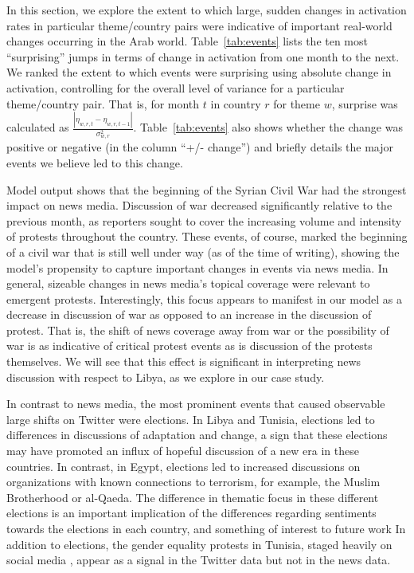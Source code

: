 In this section, we explore the extent to which large, sudden changes in activation rates in particular theme/country pairs were indicative of important real-world changes occurring in the Arab world.  Table~\ref{tab:events} lists the ten most ``surprising'' jumps in terms of change in activation from one month to the next.  We ranked the extent to which events were surprising using absolute change in activation, controlling for the overall level of variance for a particular theme/country pair.  That is, for month $t$ in country $r$ for theme $w$, surprise was calculated as $\frac{|\eta_{w,r,t}-\eta_{w,r,t-1}|}{\sigma^2_{w,r}}$.  Table~\ref{tab:events} also shows whether the change was positive or negative (in the column ``+/- change'') and briefly details the major events we believe led to this change.  

Model output shows that the beginning of the Syrian Civil War had the strongest impact on news media. Discussion of war decreased significantly relative to the previous month, as reporters sought to cover the increasing volume and intensity of protests throughout the country. These events, of course, marked the beginning of a civil war that is still well under way (as of the time of writing), showing the model’s propensity to capture important changes in events via news media. In general, sizeable changes in news media’s topical coverage were relevant to emergent protests. Interestingly, this focus appears to manifest in our model as a decrease in discussion of war as opposed to an increase in the discussion of protest. That is, the shift of news coverage away from war or the possibility of war is as indicative of critical protest events as is discussion of the protests themselves. We will see that this effect is significant in interpreting news discussion with respect to Libya, as we explore in our case study. 

In contrast to news media, the most prominent events that caused observable large shifts on Twitter were elections. In Libya and Tunisia, elections led to differences in discussions of adaptation and change, a sign that these elections may have promoted an influx of hopeful discussion of a new era in these countries. In contrast, in Egypt, elections led to increased discussions on organizations with known connections to terrorism, for example, the Muslim Brotherhood or al-Qaeda. The difference in thematic focus in these different elections is an important implication of the differences regarding sentiments towards the elections in each country, and something of interest to future work In addition to elections, the gender equality protests in Tunisia, staged heavily on social media \citep{yuce_womens_2015}, appear as a signal in the Twitter data but not in the news data.  

